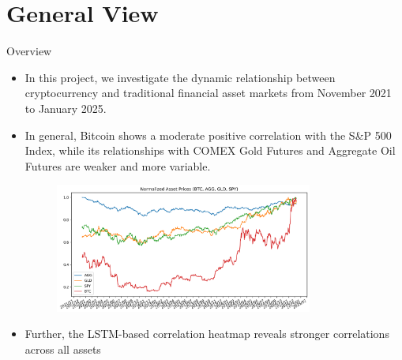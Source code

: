 \section{General View}
    \begin{frame}{Overview}
    \begin{itemize}
     \item<1-> In this project, we investigate the dynamic relationship between cryptocurrency and traditional financial asset markets from November 2021 to January 2025.
     \item<2-> In general, Bitcoin shows a moderate positive correlation with the S\&P 500 Index, while its relationships with COMEX Gold Futures and Aggregate Oil Futures are weaker and more variable.
      {\begin{figure}[h]\includegraphics[width=0.8\textwidth]{../../figure/normalized_asset_prices.png}\end{figure}}
     \item<3> Further, the LSTM-based correlation heatmap reveals stronger correlations across all assets
     
    \end{itemize}
    \end{frame}
    
 
 